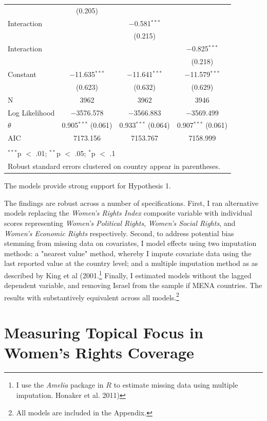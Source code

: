 \documentclass[11pt, oneside]{article}
\begin{document}
\begin{table}[!htbp]
\begin{tabular}{@{\extracolsep{5pt}}lccc}
  & (0.205) &  &  \\ 
  Interaction &  & $-$0.581$^{***}$ &  \\ 
  &  & (0.215) &  \\ 
  Interaction &  &  & $-$0.825$^{***}$ \\ 
  &  &  & (0.218) \\ 
  Constant & $-$11.635$^{***}$ & $-$11.641$^{***}$ & $-$11.579$^{***}$ \\ 
  & (0.623) & (0.632) & (0.629) \\ 
 N & 3962 & 3962 & 3946 \\ 
Log Likelihood & $-$3576.578 & $-$3566.883 & $-$3569.499 \\ 
$\theta$ & 0.905$^{***}$  (0.061) & 0.933$^{***}$  (0.064) & 0.907$^{***}$  (0.061) \\ 
AIC & 7173.156 & 7153.767 & 7158.999 \\ 
\hline \\[-1.8ex] 
\multicolumn{4}{l}{$^{***}$p $<$ .01; $^{**}$p $<$ .05; $^{*}$p $<$ .1} \\ 
\multicolumn{4}{l}{Robust standard errors clustered on country appear in parentheses.} \\ 
\end{tabular} 
\end{table} 

The models provide strong support for Hypothesis 1. 

The findings are robust across a number of specifications. First, I ran alternative models replacing the \emph{Women's Rights Index} composite variable with individual scores representing \emph{Women's Political Rights}, \emph{Women's Social Rights}, and \emph{Women's Economic Rights} respectively. Second, to address potential bias stemming from missing data on covariates, I model effects using two imputation methods: a "nearest value" method, whereby I impute covariate data using the last reported value at the country level; and a multiple imputation method as as described by King et al (2001.\footnote{\hspace{5}I use the \emph{Amelia} package in $R$ to estimate missing data using multiple imputation. Honaker et al. 2011)} Finally, I estimated models without the lagged dependent variable, and removing Israel from the sample if MENA countries. The results with substantively equivalent across all models.\footnote{\hspace{5}All models are included in the Appendix.}

\section{Measuring Topical Focus in Women's Rights Coverage}
\end{document}
